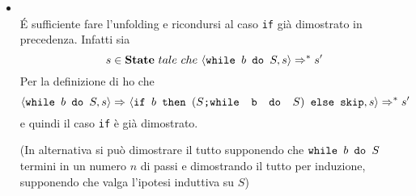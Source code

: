 {\begin{itemize}
\begin{itemize}
		Sia 
		\[ y\notin\lvar{\ifABC{b}{$S_1$}{$S_2$}} \]
		allora, per definizione di 
		\texttt{lvar}, 
		\[ y\notin\lvar{$S_1$} \cup \lvar{$S_2$} \]
		 e quindi in
		particolare 
		$y\notin\lvar{$S_1$}$. Per \hi{} vale quindi
		$s(y)=s'(y)$.

		\item {}: è analogo al precedente. 
		Nel caso in cui la
		valutazione della guardia nello stato $s$ si falsa, allora tramite la
		regola \ifffSOS{} si ha:
		\[ \confSs{\ifABC{b}{S_1}{S_2}}{s}\Rar{}\confSs{S_2}{s} \]
		sul quale so che
		vale l'\hi{}, poichè per ipotesi 
		\[ \confSs{\ifABC{b}{S_1}{S_2}}{s}\Rar{*}s'\]
		 di conseguenza 
		\[ \exists~k\in 	\mathbb{N}~tale~che~\confSs{\ifABC{b}{S_1}{S_2}}{s}
		\Rar{k}s' \]
		 e quindi 
		\[ 	\confSs{\ifABC{b}{S_1}{S_2}}{s}\Rar{}\confSs{S_2}{s}\Rar{k-1}s' \].
		
		Sia $y\notin\lvar{\ifABC{b}{$S_1$}{$S_2$}}$ allora, per definizione di 
		\texttt{lvar}, $y\notin\lvar{$S_1$} \cup \lvar{$S_2$}$ e quindi in
		particolare $y\notin\lvar{$S_2$}$. Per ipotesi induttiva vale quindi
		$s(y)=s'(y)$.
		\end{itemize}

	\item {}
	\casespace
	\\
	É sufficiente fare l'unfolding e ricondursi al caso \texttt{if} già
	dimostrato in precedenza. Infatti sia 
	\[ 	s\in\mbox{\textbf{State}}~tale~che~\langle{}\mbox{\normalfont{\texttt{while }}} b \textrm{\normalfont{\texttt{ do }}} S, s\rangle{}\Rightarrow^{*}s' \]
	Per la definizione
	di \whileSOS{} ho che 
	\[ 	\langle{}\mbox{\normalfont{\texttt{while }}} b \textrm{\normalfont{\texttt{ do }}} S, s\rangle{}\Rightarrow^{}
	\langle{}\mbox{\normalfont{\texttt{if }}} b \textrm{\normalfont{\texttt{ then }}} (\textrm{\normalfont{\texttt{$S$;\mbox{\normalfont{\texttt{while }}} b \textrm{\normalfont{\texttt{ do }}} $S$}}}) \textrm{\normalfont{\texttt{ else }}} \textrm{\normalfont{\texttt{skip}}}, s\rangle{}\Rightarrow^{*}s'\]
	e quindi il caso \texttt{if} è già dimostrato.
	
	(In alternativa si può dimostrare il tutto supponendo che $\mbox{\normalfont{\texttt{while }}} b \textrm{\normalfont{\texttt{ do }}} S$
	termini in un numero $n$ di passi e dimostrando il tutto per induzione,
	supponendo che valga l'ipotesi induttiva su $S$)
	\end{itemize}


}

\newpage